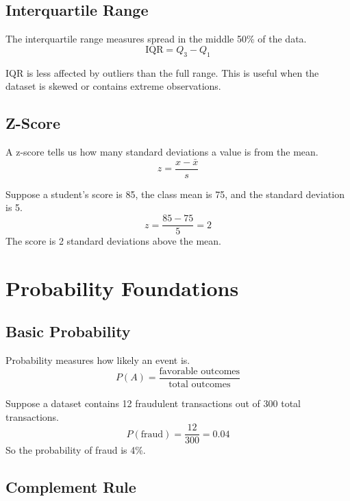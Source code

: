 \documentclass[11pt,a4paper]{article}
\begin{document}
\subsection{Interquartile Range}

The interquartile range measures spread in the middle 50\% of the data.
\[
\text{IQR} = Q_3 - Q_1
\]

\begin{conceptbox}
IQR is less affected by outliers than the full range. This is useful when the dataset is skewed or contains extreme observations.
\end{conceptbox}

\subsection{Z-Score}

A z-score tells us how many standard deviations a value is from the mean.
\[
z = \frac{x - \bar{x}}{s}
\]

\begin{examplebox}
Suppose a student's score is 85, the class mean is 75, and the standard deviation is 5.
\[
z = \frac{85-75}{5} = 2
\]
The score is 2 standard deviations above the mean.
\end{examplebox}

\section{Probability Foundations}

\subsection{Basic Probability}

Probability measures how likely an event is.
\[
P(A) = \frac{\text{favorable outcomes}}{\text{total outcomes}}
\]

\begin{examplebox}
Suppose a dataset contains 12 fraudulent transactions out of 300 total transactions.
\[
P(\text{fraud}) = \frac{12}{300} = 0.04
\]
So the probability of fraud is 4\%.
\end{examplebox}

\subsection{Complement Rule}
\end{document}
